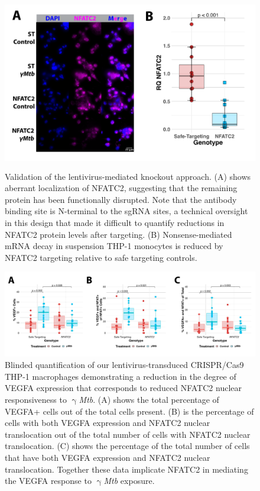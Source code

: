\begin{figure}
\centering
\includegraphics[height=3in]{images/lentivalid.pdf}
\caption[Validation of \textit{NFATC2} knockout cells]{Validation of the lentivirus\hyp{}mediated knockout approach. (A) shows aberrant localization of NFATC2, suggesting that the remaining protein has been functionally disrupted. Note that the antibody binding site is N\hyp{}terminal to the sgRNA sites, a technical oversight in this design that made it difficult to quantify reductions in NFATC2 protein levels after targeting. (B) Nonsense\hyp{}mediated mRNA decay in suspension THP\hyp{}1 monocytes is reduced by NFATC2 targeting relative to safe targeting controls.}
\label{figure:validation}
\end{figure}

\begin{figure}
\centering
\includegraphics[width=\textwidth]{images/lentiIFquant.pdf}
\caption[Quantitation of \textit{NFATC2} knockout THP-1 macrophages]{Blinded quantification of our lentivirus\hyp{}transduced CRISPR/Cas9 THP\hyp{}1 macrophages demonstrating a reduction in the degree of VEGFA expression that corresponds to reduced NFATC2 nuclear responsiveness to $\upgamma$\textit{Mtb}. (A) shows the total percentage of VEGFA+ cells out of the total cells present. (B) is the percentage of cells with both VEGFA expression and NFATC2 nuclear translocation out of the total number of cells with NFATC2 nuclear translocation. (C) shows the percentage of the total number of cells that have both VEGFA expression and NFATC2 nuclear translocation. Together these data implicate NFATC2 in mediating the VEGFA response to $\upgamma$\textit{Mtb} exposure.}
\label{figure:lentiIFquant}
\end{figure}

